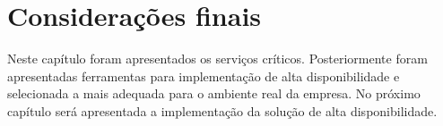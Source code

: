

\section{Considerações finais}

Neste capítulo foram apresentados os serviços críticos. Posteriormente foram apresentadas ferramentas para implementação de alta disponibilidade 
e selecionada a mais adequada para o ambiente real da empresa. No próximo capítulo será apresentada a implementação da solução de alta 
disponibilidade.

